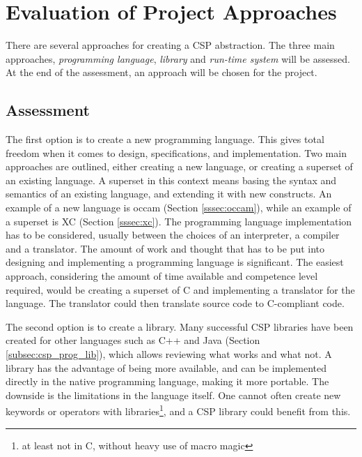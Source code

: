 
\chapter{Evaluation of Project Approaches}
\label{ch:evaluation}

There are several approaches for creating a CSP abstraction. The three main approaches, \textit{programming language}, \textit{library} and \textit{run-time system} will be assessed. At the end of the assessment, an approach will be chosen for the project. 

\section{Assessment}

The first option is to create a new programming language. This gives total freedom when it comes to design, specifications, and implementation. Two main approaches are outlined, either creating a new language, or creating a superset of an existing language. A superset in this context means basing the syntax and semantics of an existing language, and extending it with new constructs. An example of a new language is occam (Section \ref{sssec:occam}), while an example of a superset is XC (Section \ref{sssec:xc}). The programming language implementation has to be considered, usually between the choices of an interpreter, a compiler and a translator. The amount of work and thought that has to be put into designing and implementing a programming language is significant. The easiest approach, considering the amount of time available and competence level required, would be creating a superset of C and implementing a translator for the language. The translator could then translate source code to C\hyp{}compliant code.

The second option is to create a library. Many successful CSP libraries have been created for other languages such as C++ and Java (Section \ref{subsec:csp_prog_lib}), which allows reviewing what works and what not. A library has the advantage of being more available, and can be implemented directly in the native programming language, making it more portable. The downside is the limitations in the language itself. One cannot often create new keywords or operators with libraries\footnote{at least not in C, without heavy use of macro magic}, and a CSP library could benefit from this. 


